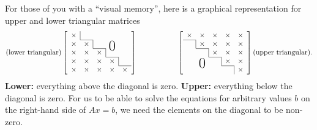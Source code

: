  

For those of you with a ``visual memory'', here is a graphical representation for upper and lower triangular matrices
\begin{equation}
\text{(lower triangular)}
 \left[
    \begin{array}{ccccc}
  \x     & \bordl &       &  & \\ \cline{2-2}
\x       & \x    & \bordl  &\bigzero & \\ \cline{3-3}
 \x      & \x    & \x  & \bordl    & \\ \cline{4-4}
  \x      & \x    & \x  &  \x & \bordl  \\  \cline{5-5}
    \x    & \x       & \x    & \x    & \x 
  \end{array}\right] \hspace*{2cm}  
\left[
    \begin{array}{ccccc}
    \x    & \x       & \x    & \x    & \x \\ \cline{1-1}
    \bord & \x       & \x    & \x    & \x \\ \cline{2-2}
          & \bord    & \x    & \x    & \x \\ \cline{3-3}
          & \bigzero & \bord & \x    & \x \\ \cline{4-4}
          &          &       & \bord & \x \\ 
  \end{array}\right]  \text{(upper triangular).} 
\end{equation}
\textbf{ Lower:}  everything above the diagonal is zero. \textbf{Upper:} everything below the diagonal is zero. For us to be able to solve the equations for arbitrary values $b$ on the right-hand side of $Ax=b$, we need the elements on the diagonal to be non-zero.\\


